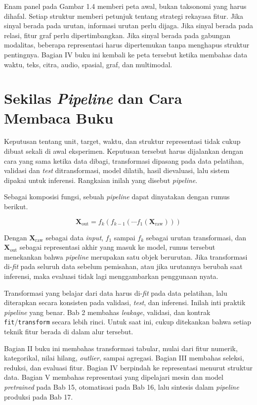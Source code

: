 Enam panel pada Gambar 1.4 memberi peta awal, bukan taksonomi yang harus dihafal. Setiap struktur memberi petunjuk tentang strategi rekayasa fitur. Jika sinyal berada pada urutan, informasi urutan perlu dijaga. Jika sinyal berada pada relasi, fitur graf perlu dipertimbangkan. Jika sinyal berada pada gabungan modalitas, beberapa representasi harus dipertemukan tanpa menghapus struktur pentingnya. Bagian IV buku ini kembali ke peta tersebut ketika membahas data waktu, teks, citra, audio, spasial, graf, dan multimodal.

\section{\texorpdfstring{Sekilas \emph{Pipeline} dan Cara Membaca Buku}{Sekilas Pipeline dan Cara Membaca Buku}}\label{sekilas-pipeline-dan-cara-membaca-buku}

Keputusan tentang unit, target, waktu, dan struktur representasi tidak cukup dibuat sekali di awal eksperimen. Keputusan tersebut harus dijalankan dengan cara yang sama ketika data dibagi, transformasi dipasang pada data pelatihan, validasi dan \emph{test} ditransformasi, model dilatih, hasil dievaluasi, lalu sistem dipakai untuk inferensi. Rangkaian inilah yang disebut \emph{pipeline}.

Sebagai komposisi fungsi, sebuah \emph{pipeline} dapat dinyatakan dengan rumus berikut.

\[
\mathbf{X}_{\text{out}} = f_k(f_{k-1}(\cdots f_1(\mathbf{X}_{\text{raw}})))
\]

Dengan \(\mathbf{X}_{\text{raw}}\) sebagai data \emph{input}, \(f_1\) sampai \(f_k\) sebagai urutan transformasi, dan \(\mathbf{X}_{\text{out}}\) sebagai representasi akhir yang masuk ke model, rumus tersebut menekankan bahwa \emph{pipeline} merupakan satu objek berurutan. Jika transformasi di-\emph{fit} pada seluruh data sebelum pemisahan, atau jika urutannya berubah saat inferensi, maka evaluasi tidak lagi menggambarkan penggunaan nyata.

Transformasi yang belajar dari data harus di-\emph{fit} pada data pelatihan, lalu diterapkan secara konsisten pada validasi, \emph{test}, dan inferensi. Inilah inti praktik \emph{pipeline} yang benar. Bab 2 membahas \emph{leakage}, validasi, dan kontrak \passthrough{\lstinline!fit!}/\passthrough{\lstinline!transform!} secara lebih rinci. Untuk saat ini, cukup ditekankan bahwa setiap teknik fitur berada di dalam alur tersebut.

Bagian II buku ini membahas transformasi tabular, mulai dari fitur numerik, kategorikal, nilai hilang, \emph{outlier}, sampai agregasi. Bagian III membahas seleksi, reduksi, dan evaluasi fitur. Bagian IV berpindah ke representasi menurut struktur data. Bagian V membahas representasi yang dipelajari mesin dan model \emph{pretrained} pada Bab 15, otomatisasi pada Bab 16, lalu sintesis dalam \emph{pipeline} produksi pada Bab 17.

